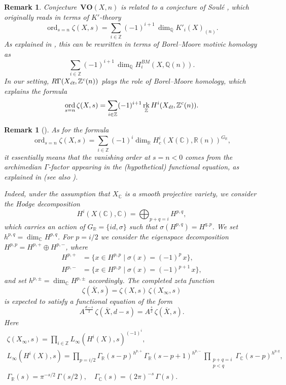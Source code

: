 \documentclass[10pt,a4paper,oneside,draft]{article}
\DeclareMathOperator{\ord}{ord}
\DeclareMathOperator{\rk}{rk}
\newcommand{\CC}{\mathbb{C}}
\newcommand{\QQ}{\mathbb{Q}}
\newcommand{\RR}{\mathbb{R}}
\newcommand{\ZZ}{\mathbb{Z}}
\newcommand{\et}{\text{\it \'{e}t}}
\theoremstyle{myplain}
\theoremstyle{mydefinition}
\newtheorem{remark}[theorem]{Remark}
\numberwithin{equation}{section}
\begin{document}
\begin{remark}
  Conjecture~$\mathbf{VO} (X,n)$ is related to a conjecture of Soul\'{e}
  \cite[Conjecture~2.2]{Soule-1984-ICM}, which originally reads in terms of
  $K'$-theory
  \[ \ord_{s=n} \zeta (X,s) =
    \sum_{i \in \ZZ} (-1)^{i+1} \, \dim_\QQ K'_i (X)_{(n)}. \]
  As explained in \cite[Remark~43]{Kahn-2005}, this can be rewritten in
  terms of Borel--Moore motivic homology as
  $$\sum_{i \in \ZZ} (-1)^{i+1} \, \dim_\QQ H_i^{BM} (X, \QQ (n)).$$
  In our setting, $R\Gamma (X_\et, \ZZ^c (n))$ plays the role of Borel--Moore
  homology, which explains the formula
  \[ \ord_{s=n} \zeta (X,s) =
    \sum_{i \in \ZZ} (-1)^{i+1} \rk_\ZZ H^i (X_\et, \ZZ^c (n)). \]
\end{remark}

\begin{remark}[{\cite[Proposition~5.13]{Flach-Morin-2018}}]
  \label{rmk:archimedian-euler-factor}
  As for the formula
  \[ \ord_{s=n} \zeta (X,s) =
    \sum_{i \in \ZZ} (-1)^i \dim_\RR H^i_c (X(\CC), \RR (n))^{G_\RR}, \]
  it essentially means that the vanishing order at $s = n < 0$ comes from the
  archimedian $\Gamma$-factor appearing in the (hypothetical) functional
  equation, as explained in \cite[\S\S 3,4]{Serre-1970}
  (see also \cite[\S 4]{Flach-Morin-2020}).

  Indeed, under the assumption that $X_\CC$ is a smooth projective variety, we
  consider the Hodge decomposition
  \[ H^i (X (\CC), \CC) = \bigoplus_{p+q = i} H^{p,q}, \]
  which carries an action of $G_\RR = \{ id, \sigma \}$ such that
  $\sigma (H^{p,q}) = H^{q,p}$. We set $h^{p,q} = \dim_\CC H^{p,q}$.
  For $p = i/2$ we consider the eigenspace decomposition
  $H^{p,p} = H^{p,+} \oplus H^{p,-}$, where
  \begin{align*}
    H^{p,+} & = \{ x \in H^{p,p} \mid \sigma (x) = (-1)^p\,x \},\\
    H^{p,-} & = \{ x \in H^{p,p} \mid \sigma (x) = (-1)^{p+1}\,x \},
  \end{align*}
  and set $h^{p,\pm} = \dim_\CC H^{p,\pm}$ accordingly.
  The completed zeta function
  $$\zeta (\overline{X}, s) = \zeta (X, s)\,\zeta (X_\infty, s)$$
  is expected to satisfy a functional equation of the form
  \[ A^{\frac{d-s}{2}}\,\zeta (\overline{X},d-s) =
    A^{\frac{s}{2}}\,\zeta (\overline{X},s). \]
  Here
  \begin{gather*}
    \zeta (X_\infty, s) = \prod_{i\in \ZZ} L_\infty (H^i (X),s)^{(-1)^i}, \\
    L_\infty (H^i (X), s) =
    \prod_{p = i/2} \Gamma_\RR (s - p)^{h^{p,+}}\,\Gamma_\RR (s-p+1)^{h^{p,-}} \,
    \prod_{\substack{p + q = i \\ p < q}} \Gamma_\CC (s - p)^{h^{p,q}}, \\
    \Gamma_\RR (s) = \pi^{-s/2} \, \Gamma (s/2), \quad
    \Gamma_\CC (s) = (2\pi)^{-s} \, \Gamma (s).
  \end{gather*}


\end{remark}
\end{document}
